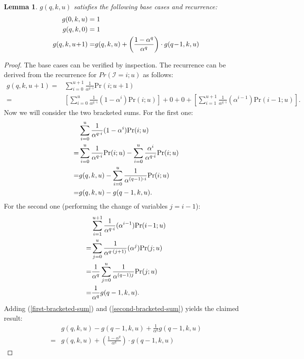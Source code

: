 \documentclass{article}
\newtheorem{lemma}[theorem]{Lemma}
\begin{document}
\begin{lemma}\label{lemma:gqku-recurrences}
$g(q,k,u)$ satisfies the following base cases and recurrence:
\begin{align}
g(0,k,u) = & \;1 \notag \\
g(q,k,0) = & \;1 \notag \\
g(q,k,u\!+\!1) = & g(q,k,u) + \left(\frac{1-\alpha^q}{\alpha^q}\right) \cdot g(q\!-\!1,k,u) \label{eqn:gqku-recurrence}
\end{align}
\end{lemma}
\begin{proof}
The base cases can be verified by inspection. The recurrence can be derived from the
recurrence for $Pr(\mathcal{I}\!=\!i ; u)$ as follows:
\begin{align*} 
  g(q,k,u\!+\!1)
= & \sum_{i=0}^{u+1} \frac{1}{\alpha^{q\cdot i}} \mathrm{Pr}(i;u+1) \\
= & \left[ \sum_{i=0}^{u} \frac{1}{\alpha^{q \cdot i}} (1-\alpha^i) \mathrm{Pr}(i;u) \right] + 0 
   + 0 + \left[ \sum_{i=1}^{u+1} \frac{1}{\alpha^{q \cdot i}} (\alpha^{i-1}) \mathrm{Pr}(i\!-\!1;u) \right].
\end{align*} 
\noindent Now we will consider the two bracketed sums. For the first one:
\begin{align} 
  & \sum_{i=0}^{u} \frac{1}{\alpha^{q \cdot i}} (1-\alpha^i) \mathrm{Pr}(i;u) \notag \\
= & \sum_{i=0}^u \frac{1}{\alpha^{q\cdot i}} \mathrm{Pr}(i;u) - \sum_{i=0}^u \frac{\alpha^i}{\alpha^{q \cdot i}} \mathrm{Pr}(i;u) \notag \\
= & g(q,k,u) - \sum_{i=0}^u \frac{1}{\alpha^{(q-1)\cdot i}} \mathrm{Pr}(i;u) \notag \\
= & g(q,k,u) - g(q-1,k,u).\label{first-bracketed-sum}
\end{align}
\noindent For the second one (performing the change of variables $j = i\!-\!1$):
\begin{align} 
  & \sum_{i=1}^{u+1} \frac{1}{\alpha^{q\cdot i}} (\alpha^{i-1}) \mathrm{Pr}(i\!-\!1;u) \notag \\
= & \sum_{j=0}^{u} \frac{1}{\alpha^{q \cdot (j+1)}} (\alpha^{j}) \mathrm{Pr}(j;u)\notag \\
= & \frac{1}{\alpha^q}\sum_{j=0}^{u} \frac{1}{\alpha^{(q-1)j}} \mathrm{Pr}(j;u) \notag \\
= & \frac{1}{\alpha^q} g(q-1,k,u).\label{second-bracketed-sum}
\end{align}
\noindent Adding (\ref{first-bracketed-sum}) and (\ref{second-bracketed-sum})
yields the claimed result:
\begin{align*} 
  & g(q,k,u) - g(q-1,k,u) + \frac{1}{\alpha^q} g(q-1,k,u) \\
= & g(q,k,u) + \left(\frac{1-\alpha^q}{\alpha^q}\right) \cdot g(q\!-\!1,k,u)
\end{align*}
\end{proof}
\end{document}
